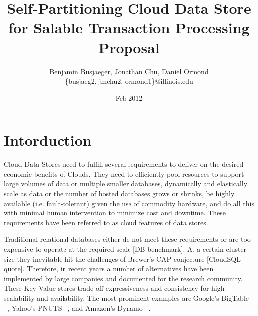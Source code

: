\documentclass[10pt,final,journal]{IEEEtran}
\begin{document}
\title{Self-Partitioning Cloud Data Store for Salable Transaction Processing Proposal}
\author{Benjamin Busjaeger, Jonathan Chu, Daniel Ormond \\
\{busjaeg2, jmchu2, ormond1\}@illinois.edu}
\date{Feb 2012}
\maketitle



\section{Intorduction}
Cloud Data Stores need to fulfill several requirements to deliver on the desired economic benefits of Clouds. They need to efficiently pool resources to support large volumes of data or multiple smaller databases, dynamically and elastically scale as data or the number of hosted databases grows or shrinks, be highly available (i.e. fault-tolerant) given the use of commodity hardware, and do all this with minimal human intervention to minimize cost and downtime. These requirements have been referred to as cloud features of data stores.

Traditional relational databases either do not meet these requirements or are too expensive to operate at the required scale [DB benchmark]. At a certain cluster size they inevitable hit the challenges of Brewer's CAP conjecture [CloudSQL quote]. Therefore, in recent years a number of alternatives have been implemented by large companies and documented for the research community. These Key-Value stores trade off expressiveness and consistency for high scalability and availability. The most prominent examples are Google's BigTable ~\cite{Chang:2006:BDS:1267308.1267323}, Yahoo's PNUTS ~\cite{Cooper:2008:PYH:1454159.1454167}, and Amazon's Dynamo ~\cite{DeCandia:2007:DAH:1323293.1294281}.
\end{document}
